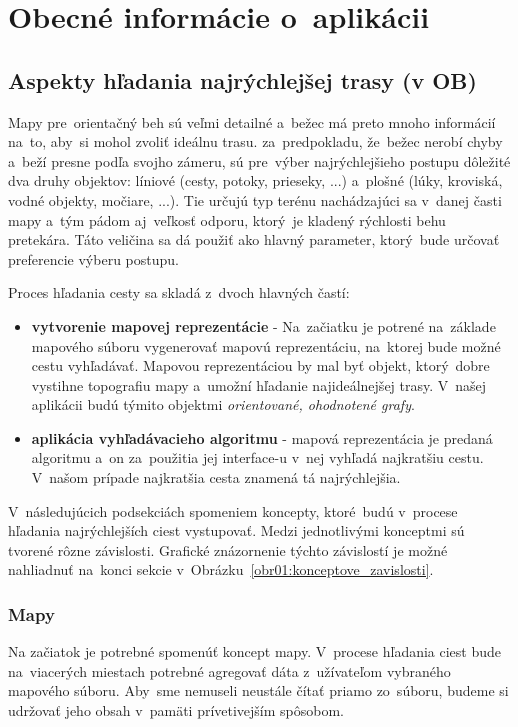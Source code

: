 \chapter{Obecné informácie o~aplikácii}

\section{Aspekty hľadania najrýchlejšej trasy (v OB)}\label{Aspekty_hladania}

Mapy pre~orientačný beh sú veľmi detailné a~bežec má preto mnoho informácií na~to, aby~si mohol zvoliť ideálnu trasu. za~predpokladu, že~bežec nerobí chyby a~beží presne podľa svojho zámeru, sú pre~výber najrýchlejšieho postupu dôležité dva druhy objektov: líniové (cesty, potoky, prieseky, ...) a~plošné (lúky, kroviská, vodné objekty, močiare, ...). Tie určujú typ terénu nachádzajúci sa v~danej časti mapy a~tým pádom aj~veľkosť odporu, ktorý~je kladený rýchlosti behu pretekára. Táto veličina sa dá použiť ako hlavný parameter, ktorý~bude určovať preferencie výberu postupu.

Proces hľadania cesty sa skladá z~dvoch hlavných častí: 
\begin{itemize}
    \item \textbf{vytvorenie mapovej reprezentácie} - Na~začiatku je potrené na~základe mapového súboru vygenerovať mapovú reprezentáciu, na~ktorej bude možné cestu vyhľadávať. Mapovou reprezentáciou by mal byť objekt, ktorý~dobre vystihne topografiu mapy a~umožní hľadanie najideálnejšej trasy. V~našej aplikácii budú týmito objektmi \textit{orientované, ohodnotené grafy}.  
    \item \textbf{aplikácia vyhľadávacieho algoritmu} - mapová reprezentácia je predaná algoritmu a~on za~použitia jej interface-u v~nej vyhľadá najkratšiu cestu. V~našom prípade najkratšia cesta znamená tá najrýchlejšia.
\end{itemize}

V~následujúcich podsekciách spomeniem koncepty, ktoré~budú v~procese hľadania najrýchlejších ciest vystupovať. Medzi jednotlivými konceptmi sú tvorené rôzne závislosti. Grafické znázornenie týchto závislostí je možné nahliadnuť na~konci sekcie v~Obrázku~\ref{obr01:konceptove_zavislosti}.   

\subsection{Mapy}\label{mapy}

Na začiatok je potrebné spomenúť koncept mapy. V~procese hľadania ciest bude na~viacerých miestach potrebné agregovať dáta z~užívateľom vybraného mapového súboru. Aby~sme nemuseli neustále čítať priamo zo~súboru, budeme si udržovať jeho obsah v~pamäti prívetivejším spôsobom. 


